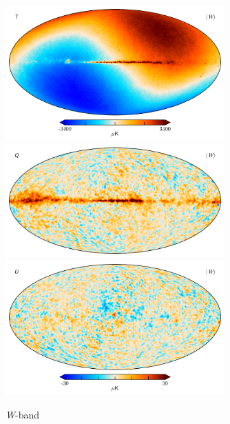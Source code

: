 \documentclass[twocolumn]{../../common/aa}
\newcommand{\W}[0]{\textit W}
\begin{document}
\begin{figure}
	\centering
	\includegraphics[width=0.75\textwidth]{figures/W_mu_I.pdf}
	\includegraphics[width=0.75\textwidth]{figures/W_mu_Q.pdf}
	\includegraphics[width=0.75\textwidth]{figures/W_mu_U.pdf}
	\caption{\W-band}
	\label{fig:wband}
\end{figure}


\end{document}
